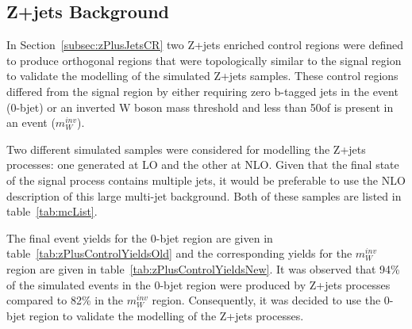 \subsection{Z+jets Background}\label{subsec:zPlusJetsEstimation}
In Section~\ref{subsec:zPlusJetsCR} two Z+jets enriched control regions were defined to produce orthogonal regions that were topologically similar to the signal region to validate the modelling of the simulated Z+jets samples.
These control regions differed from the signal region by either requiring zero b-tagged jets in the event (0-bjet) or an inverted W boson mass threshold and less than 50\GeV of \MET is present in an event ($m_{W}^{inv}$).

Two different simulated samples were considered for modelling the Z+jets processes: one generated at LO and the other at NLO.
Given that the final state of the signal process contains multiple jets, it would be preferable to use the NLO description of this large multi-jet background.
Both of these samples are listed in table~\ref{tab:mcList}.

The final event yields for the 0-bjet region are given in table~\ref{tab:zPlusControlYieldsOld} and the corresponding yields for the $m_{W}^{inv}$ region are given in table~\ref{tab:zPlusControlYieldsNew}.
It was observed that 94\% of the simulated events in the 0-bjet region were produced by Z+jets processes compared to 82\% in the $m_{W}^{inv}$ region.
Consequently, it was decided to use the 0-bjet region to validate the modelling of the Z+jets processes.

